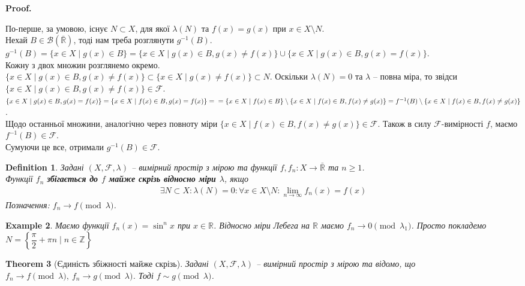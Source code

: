 \documentclass[a4paper, 10pt]{article}
\makeatletter
\theoremstyle{theoremdd}
\newtheorem{theorem}{Theorem}[subsection]
\newtheorem{definition}[theorem]{Definition}
\newtheorem{example}[theorem]{Example}
\renewenvironment{proof}[1][Proof.\\]{\par
\pushQED{\hfill \qed}%
\normalfont \topsep6\p@\@plus6\p@\relax
\trivlist
\item\relax
{\bfseries
#1\@addpunct{.}}\hspace\labelsep\ignorespaces
}{%
\popQED\endtrivlist\@endpefalse
}
\makeatother
\begin{document}
\begin{proof}
По-перше, за умовою, існує $N \subset X$, для якої $\lambda(N)$ та $f(x) = g(x)$ при $x \in X \setminus N$.\\
Нехай $B \in \mathcal{B}(\bar{\mathbb{R}})$, тоді нам треба розглянути $g^{-1}(B)$.\\
$g^{-1}(B) = \{x \in X \mid g(x) \in B\} = \{x \in X \mid g(x) \in B, g(x) \neq f(x)\} \cup \{x \in X \mid g(x) \in B, g(x) = f(x)\}$.\\
Кожну з двох множин розглянемо окремо.\\
$\{x \in X \mid g(x) \in B, g(x) \neq f(x)\} \subset \{x \in X \mid g(x) \neq f(x)\} \subset N$. Оскільки $\lambda(N) = 0$ та $\lambda$ -- повна міра, то звідси $\{x \in X \mid g(x) \in B, g(x) \neq f(x)\} \in \mathcal{F}$.\\
$\{x \in X \mid g(x) \in B, g(x) = f(x)\} = \{x \in X \mid f(x) \in B, g(x) = f(x)\} = \\ =\{x \in X \mid f(x) \in B\} \setminus \{x \in X \mid f(x) \in B, f(x) \neq g(x)\} = f^{-1}(B) \setminus \{x \in X \mid f(x) \in B, f(x) \neq g(x)\}$.\\
Щодо останньої множини, аналогічно через повноту міри $\{x \in X \mid f(x) \in B, f(x) \neq g(x)\} \in \mathcal{F}$. Також в силу $\mathcal{F}$-вимірності $f$, маємо $f^{-1}(B) \in \mathcal{F}$.\\
Сумуючи це все, отримали $g^{-1}(B) \in \mathcal{F}$.
\end{proof}

\begin{definition}
Задані $(X,\mathcal{F},\lambda)$ -- вимірний простір з мірою та функції $f,f_n \colon X \to \bar{\mathbb{R}}$ та $n \geq 1$.\\
Функції $f_n$ \textbf{збігається до $f$ майже скрізь відносно міри $\lambda$}, якщо
\begin{align*}
\exists N \subset X: \lambda(N) = 0: \forall x \in X \setminus N: \lim_{n \to \infty} f_n(x) =f(x)
\end{align*}
Позначення: $f_n \to f \pmod{\lambda}$.
\end{definition}

\begin{example}
Маємо функції $f_n(x) = \sin^n x$ при $x \in \mathbb{R}$. Відносно міри Лебега на $\mathbb{R}$ маємо $f_n \to 0 \pmod{\lambda_1}$. Просто покладемо $N = \left\{ \dfrac{\pi}{2} + \pi n \mid n \in \mathbb{Z} \right\}$
\end{example}

\begin{theorem}[Єдиність збіжності майже скрізь]
Задані $(X,\mathcal{F},\lambda)$ -- вимірний простір з мірою та відомо, що $f_n \to f \pmod \lambda,\ f_n \to g \pmod \lambda$. Тоді $f \sim g \pmod \lambda$.
\end{theorem}
\end{document}
